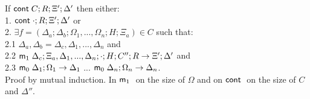If $\mathsf{cont} \; C; R; \Xi'; \Delta'$ then either:\\
1. \hspace{1cm} $\mathsf{cont} \; \cdot; R; \Xi'; \Delta'$ or \\
2. \hspace{1cm} $\exists f = (\Delta_a; \Delta_b; \Omega_1, ..., \Omega_n; H; \Xi_a) \in C$ such that:\\
2.1 \hspace{2cm} $\Delta_a, \Delta_b = \Delta_c, \Delta_1, ..., \Delta_n$ and \\
2.2 \hspace{2cm} $\mathsf{m}_1 \; \Delta_c; \Xi_a, \Delta_1, ..., \Delta_n; \cdot; H; C''; R \rightarrow \Xi'; \Delta'$ and \\
2.3 \hspace{2cm} $\mathsf{m}_0 \; \Delta_1; \Omega_1 \rightarrow \Delta_1$ ... $\mathsf{m}_0 \; \Delta_n; \Omega_n \rightarrow \Delta_n$.\\

Proof by mutual induction. In $\mathsf{m}_1 \;$ on the size of $\Omega$ and on $\mathsf{cont} \;$ on the size of $C$ and $\Delta''$.

